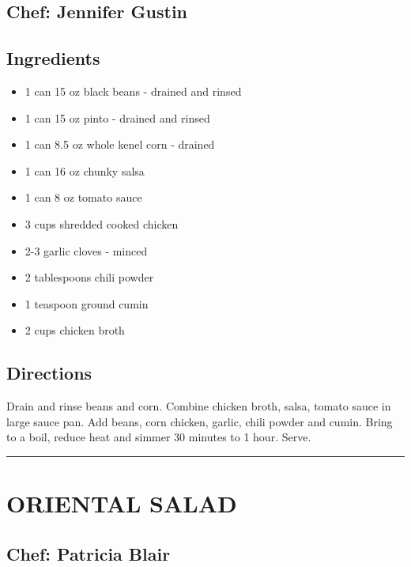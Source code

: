 \documentclass[
]{book}
\providecommand{\tightlist}{%
  \setlength{\itemsep}{0pt}\setlength{\parskip}{0pt}}
\begin{document}
\hypertarget{chef-jennifer-gustin-5}{%
\subsection*{Chef: Jennifer Gustin}\label{chef-jennifer-gustin-5}}


\hypertarget{ingredients-21}{%
\subsection*{Ingredients}\label{ingredients-21}}


\begin{itemize}
\tightlist
\item
  1 can 15 oz black beans - drained and rinsed
\item
  1 can 15 oz pinto - drained and rinsed
\item
  1 can 8.5 oz whole kenel corn - drained
\item
  1 can 16 oz chunky salsa
\item
  1 can 8 oz tomato sauce
\item
  3 cups shredded cooked chicken
\item
  2-3 garlic cloves - minced
\item
  2 tablespoons chili powder
\item
  1 teaspoon ground cumin
\item
  2 cups chicken broth
\end{itemize}

\hypertarget{directions-21}{%
\subsection*{Directions}\label{directions-21}}


Drain and rinse beans and corn. Combine chicken broth, salsa, tomato sauce in large sauce pan. Add beans, corn chicken, garlic, chili powder and cumin. Bring to a boil, reduce heat and simmer 30 minutes to 1 hour. Serve.

\begin{center}\rule{0.5\linewidth}{0.5pt}\end{center}

\hypertarget{oriental-salad}{%
\section*{ORIENTAL SALAD}\label{oriental-salad}}


\hypertarget{chef-patricia-blair-6}{%
\subsection*{Chef: Patricia Blair}\label{chef-patricia-blair-6}}
\end{document}
